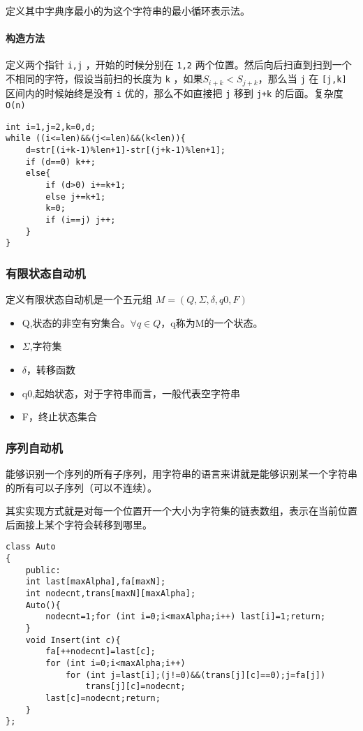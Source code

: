 \documentclass[UTF-8]{ctexart}
\begin{document}
	定义其中字典序最小的为这个字符串的最小循环表示法。
	
	\paragraph{构造方法} 定义两个指针 \texttt{i,j} ，开始的时候分别在 \texttt{1,2} 两个位置。然后向后扫直到扫到一个不相同的字符，假设当前扫的长度为 \texttt{k} ，如果$S_{i+k} < S_{j+k}$，那么当 \texttt{j} 在 \texttt{[j,k]} 区间内的时候始终是没有 \texttt{i} 优的，那么不如直接把 \texttt{j} 移到 \texttt{j+k} 的后面。复杂度 \texttt{O(n)}
\begin{verbatim}
int i=1,j=2,k=0,d;
while ((i<=len)&&(j<=len)&&(k<len)){
    d=str[(i+k-1)%len+1]-str[(j+k-1)%len+1];
    if (d==0) k++;
    else{
        if (d>0) i+=k+1;
        else j+=k+1;
        k=0;
        if (i==j) j++;
    }
}
\end{verbatim}
	\subsubsection{有限状态自动机}
	定义有限状态自动机是一个五元组 $M=(Q, \Sigma, \delta, q0, F)$
	
	\begin{itemize}
		\item Q,状态的非空有穷集合。$\forall q \in Q$，q称为M的一个状态。
		\item $\Sigma$,字符集
		\item $\delta$，转移函数
		\item q0,起始状态，对于字符串而言，一般代表空字符串
		\item F，终止状态集合
	\end{itemize}
	
	\subsubsection{序列自动机}
	能够识别一个序列的所有子序列，用字符串的语言来讲就是能够识别某一个字符串的所有可以子序列（可以不连续）。
	
	其实实现方式就是对每一个位置开一个大小为字符集的链表数组，表示在当前位置后面接上某个字符会转移到哪里。
\begin{verbatim}
class Auto
{
    public:
    int last[maxAlpha],fa[maxN];
    int nodecnt,trans[maxN][maxAlpha];
    Auto(){
        nodecnt=1;for (int i=0;i<maxAlpha;i++) last[i]=1;return;
    }
    void Insert(int c){
        fa[++nodecnt]=last[c];
        for (int i=0;i<maxAlpha;i++)
            for (int j=last[i];(j!=0)&&(trans[j][c]==0);j=fa[j])
                trans[j][c]=nodecnt;
        last[c]=nodecnt;return;
    }
};
\end{verbatim}
\end{document}
